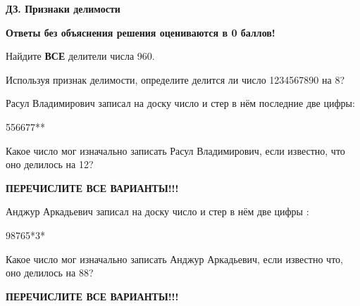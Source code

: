 \centerline{\bf \Huge ДЗ. Признаки делимости}
\centerline{\bf \Huge }

\begin{flushright}
        \scriptsize{\textbf{Ответы без объяснения решения оцениваются в 0 баллов!}}
\end{flushright}

 Найдите \textbf{ВСЕ} делители числа 960.

 Используя признак делимости, определите делится ли число 1234567890 на 8?


 Расул Владимирович записал на доску число и стер в нём последние две цифры: 

556677**

Какое число мог изначально записать Расул Владимирович, если известно, что оно делилось на 12?

\textbf{ПЕРЕЧИСЛИТЕ ВСЕ ВАРИАНТЫ!!!}

  Анджур Аркадьевич записал на доску число и стер в нём две цифры :

98765*3*

Какое число мог изначально записать Анджур Аркадьевич, если известно что, оно делилось на 88? 

\textbf{ПЕРЕЧИСЛИТЕ ВСЕ ВАРИАНТЫ!!!}



